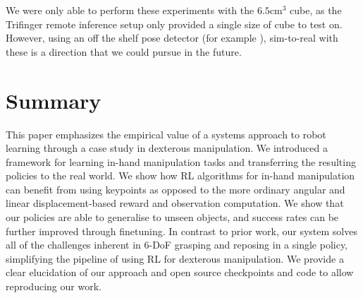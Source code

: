 \documentclass[letterpaper, 10 pt, conference]{ieeeconf}  %
\begin{document}
We were only able to perform these experiments with the $6.5\text{cm}^3$ cube, as the Trifinger remote inference setup only provided a single size of cube to test on. However, using an off the shelf pose detector (for example \citep{tremblay2018deep, cosypose}), sim-to-real with these is a direction that we could pursue in the future.

\vspace{-5pt}
\section{Summary}
\vspace{-5pt}

This paper emphasizes the empirical value of a systems approach to robot learning through a case study in dexterous manipulation. 
We introduced a framework for learning in-hand manipulation tasks and transferring the resulting policies to the real world. We show how RL algorithms for in-hand manipulation can benefit from using keypoints as opposed to the more ordinary angular and linear displacement-based reward and observation computation. We show that our policies are able to generalise to unseen objects, and success rates can be further improved through finetuning. 
In contrast to prior work, our system solves all of the challenges inherent in 6-DoF grasping and reposing in a single policy, simplifying the pipeline of using RL for dexterous manipulation. We provide a clear elucidation of our approach and open source checkpoints and code to allow reproducing our work.




\end{document}
